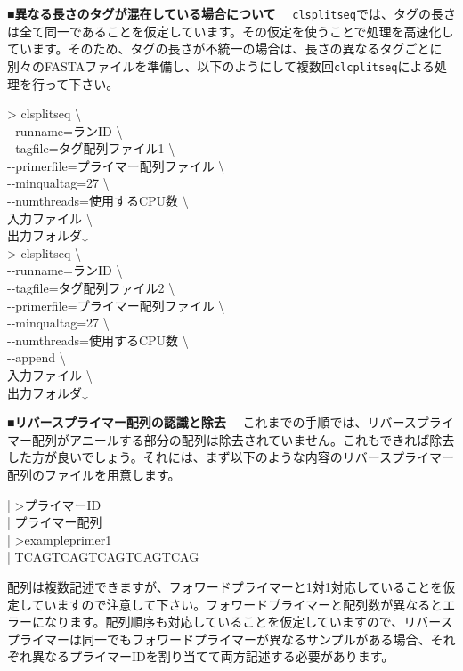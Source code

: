 \documentclass[titlepage,10pt,a4paper]{jsbook}
\newenvironment{content}{\begin{shaded}\vspace{-1em}\raggedright\ttfamily\footnotesize\setlength{\baselineskip}{1.4em}}{\end{shaded}\vspace{-1em}}
\newenvironment{cmd}{\begin{oframed}\raggedright\ttfamily\footnotesize\setlength{\baselineskip}{1.4em}}{\end{oframed}\vspace{-1em}}
\begin{document}
\textbf{■異なる長さのタグが混在している場合について　}
\texttt{clsplitseq}では、タグの長さは全て同一であることを仮定しています。その仮定を使うことで処理を高速化しています。そのため、タグの長さが不統一の場合は、長さの異なるタグごとに別々のFASTAファイルを準備し、以下のようにして複数回\texttt{clcplitseq}による処理を行って下さい。
\begin{cmd}
{\textgreater} clsplitseq {\textbackslash}\\
{-}{-}runname=ランID {\textbackslash}\\
{-}{-}tagfile=タグ配列ファイル1 {\textbackslash}\\
{-}{-}primerfile=プライマー配列ファイル {\textbackslash}\\
{-}{-}minqualtag=27 {\textbackslash}\\
{-}{-}numthreads=使用するCPU数 {\textbackslash}\\
入力ファイル {\textbackslash}\\
出力フォルダ↓\\
{\textgreater} clsplitseq {\textbackslash}\\
{-}{-}runname=ランID {\textbackslash}\\
{-}{-}tagfile=タグ配列ファイル2 {\textbackslash}\\
{-}{-}primerfile=プライマー配列ファイル {\textbackslash}\\
{-}{-}minqualtag=27 {\textbackslash}\\
{-}{-}numthreads=使用するCPU数 {\textbackslash}\\
{-}{-}append {\textbackslash}\\
入力ファイル {\textbackslash}\\
出力フォルダ↓
\end{cmd}

\textbf{■リバースプライマー配列の認識と除去　}
これまでの手順では、リバースプライマー配列がアニールする部分の配列は除去されていません。これもできれば除去した方が良いでしょう。それには、まず以下のような内容のリバースプライマー配列のファイルを用意します。
\begin{content}
| {\textgreater}プライマーID\\
| プライマー配列\\
| {\textgreater}exampleprimer1\\
| TCAGTCAGTCAGTCAGTCAG
\end{content}
配列は複数記述できますが、フォワードプライマーと1対1対応していることを仮定していますので注意して下さい。フォワードプライマーと配列数が異なるとエラーになります。配列順序も対応していることを仮定していますので、リバースプライマーは同一でもフォワードプライマーが異なるサンプルがある場合、それぞれ異なるプライマーIDを割り当てて両方記述する必要があります。
\end{document}
